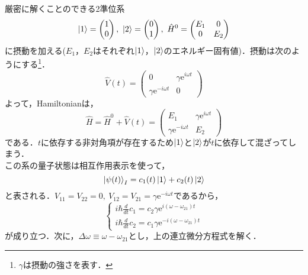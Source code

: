 \documentclass{report}
\begin{document}
  厳密に解くことのできる2準位系
  \begin{equation}
    \ket{1}=\begin{pmatrix}
      1\\
      0
    \end{pmatrix},\ 
    \ket{2}=\begin{pmatrix}
      0\\
      1
    \end{pmatrix},\ 
    \hat{H}^0=\begin{pmatrix}
      E_1 & 0\\
      0 & E_2
    \end{pmatrix}
  \end{equation}
  に摂動を加える($E_1$，$E_2$はそれぞれ$\ket{1}$，$\ket{2}$のエネルギー固有値)．摂動は次のようにする\footnote{$\gamma$は摂動の強さを表す．}．
  \begin{equation}
    \hat{V}(t)=\begin{pmatrix}
      0& \gamma\mathrm{e}^{i\omega t}\\
      \gamma \mathrm{e}^{-i\omega t}&0
    \end{pmatrix}
  \end{equation}
  よって，Hamiltonianは，
  \begin{equation}
    \hat{H}=\hat{H}^0+\hat{V}(t)=\begin{pmatrix}
      E_1&\gamma\mathrm{e}^{i\omega t}\\
      \gamma\mathrm{e}^{-i\omega t}&E_2
    \end{pmatrix}
  \end{equation}
  である．$t$に依存する非対角項が存在するため$\ket{1}$と$\ket{2}$が$t$に依存して混ざってしまう．\\
  この系の量子状態は相互作用表示を使って，
  \begin{equation}
    \ket{\psi(t)}_I=c_1(t)\ket{1}+c_2(t)\ket{2}
  \end{equation}
  と表される．$V_{11}=V_{22}=0,\ V_{12}=V_{21}=\gamma\mathrm{e}^{-i\omega t}$であるから，
  \begin{equation}
    \begin{cases}
      i\hbar\frac{d}{dt}c_1=c_2\gamma\mathrm{e}^{i(\omega-\omega_{21})t}\\
      i\hbar\frac{d}{dt}c_2=c_1\gamma\mathrm{e}^{-i(\omega-\omega_{21})t}
    \end{cases}
  \end{equation}
  が成り立つ．次に，$\Delta\omega\equiv\omega-\omega_{21}$とし，上の連立微分方程式を解く．\\
\end{document}
